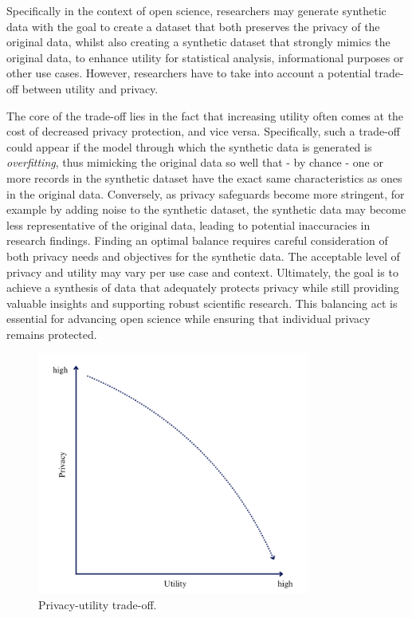 Specifically in the context of open science, researchers may generate synthetic data with the goal to create a dataset that both preserves the privacy of the original data, whilst also creating a synthetic dataset that strongly mimics the original data, to enhance utility for statistical analysis, informational purposes or other use cases. However, researchers have to take into account a potential trade-off between utility and privacy.

The core of the trade-off lies in the fact that increasing utility often comes at the cost of decreased privacy protection, and vice versa. Specifically, such a trade-off could appear if the model through which the synthetic data is generated is \textit{overfitting}, thus mimicking the original data so well that - by chance - one or more records in the synthetic dataset have the exact same characteristics as ones in the original data. Conversely, as privacy safeguards become more stringent, for example by adding noise to the synthetic dataset, the synthetic data may become less representative of the original data, leading to potential inaccuracies in research findings. Finding an optimal balance requires careful consideration of both privacy needs and objectives for the synthetic data. The acceptable level of privacy and utility may vary per use case and context. Ultimately, the goal is to achieve a synthesis of data that adequately protects privacy while still providing valuable insights and supporting robust scientific research. This balancing act is essential for advancing open science while ensuring that individual privacy remains protected. 

\begin{figure}[H]
    \centering
    \includegraphics[width=0.8\textwidth]{Images/Screenshot 2024-08-06 at 13.06.13.png}
    \caption{Privacy-utility trade-off.}
    \label{fig:synthesis_1}
\end{figure}














